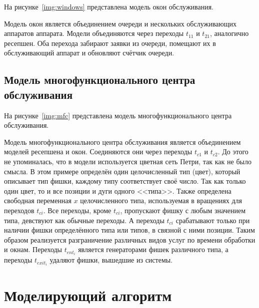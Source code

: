 На рисунке~\ref{img:windows} представлена модель окон обслуживания.

\FloatBarrier

Модель окон является объединением очереди и нескольких обслуживающих аппаратов аппарата. Модели объединяются через переходы $t_{11}$ и $t_{21}$, аналогично ресепшен. Оба перехода забирают заявки из очереди, помещают их в обслуживающий аппарат и обновляют счётчик очереди.

\subsection{Модель многофункционального центра обслуживания}

На рисунке~\ref{img:mfc} представлена модель многофункционального центра обслуживания.

\FloatBarrier

Модель многофункционального центра обслуживания является объединением моделей ресепшена и окон. Соединяются они через переходы $t_{c1}$ и $t_{c2}$. До этого не упоминалась, что в модели используется цветная сеть Петри, так как не было смысла. В этом примере определён один целочисленный тип (цвет), который описывает тип фишки, каждому типу соответствует своё число. Так как только один цвет, то и все позиции и дуги одного <<типа>>. Также определена свободная переменная $x$ целочисленного типа, используемая в вращениях для переходов $t_{ci}$. Все переходы, кроме $t_{ci}$, пропускают фишку с любым значением типа, девствуют как обычные переходы. А переходы $t_{ci}$ срабатывают только при наличии фишки определённого типа или типов, в связной с ними позиции. Таким образом реализуется разграничение различных видов услуг по времени обработки и окнам. Переходы $t_{ent_i}$ является генераторами фишек различного типа, а переходы $t_{exit_i}$ удаляют фишки, вышедшие из системы. 

\section{Моделирующий алгоритм}

